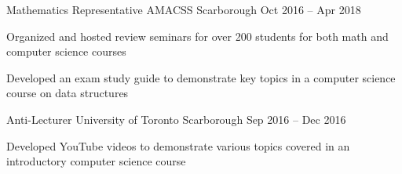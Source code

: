 \begin{cventries}
  \cventry
    {Mathematics Representative}
    {AMACSS}
    {Scarborough}
    {Oct 2016 -- Apr 2018}
    {}
    {
      \begin{cvitems}
        \item {Organized and hosted review seminars for over 200 students for both math and computer science courses}
        \item {Developed an exam study guide to demonstrate key topics in a computer science course on data structures}
      \end{cvitems}
    }
  \cventry
    {Anti-Lecturer}
    {University of Toronto}
    {Scarborough}
    {Sep 2016 -- Dec 2016}
    {}
    {
      \begin{cvitems}
        \item {Developed YouTube videos to demonstrate various topics covered in an introductory computer science course}
      \end{cvitems}
    }
\end{cventries}
